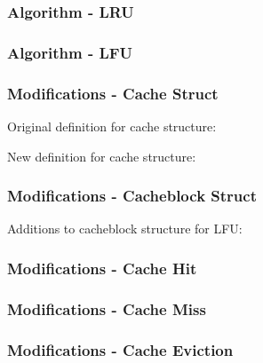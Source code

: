 \documentclass{beamer}
\begin{document}
\begin{frame}
  \frametitle{Algorithm - LRU}

  

\end{frame}

\begin{frame}
  \frametitle{Algorithm - LFU}

  

\end{frame}

\begin{frame}
  \frametitle{Modifications - Cache Struct}

  Original definition for cache structure:
  \begin{adjustbox}{width=\textwidth,keepaspectratio}
    
  \end{adjustbox}

  \vspace{\baselineskip}

  New definition for cache structure:
  \begin{adjustbox}{width=\textwidth,keepaspectratio}
    
  \end{adjustbox}

\end{frame}

\begin{frame}
  \frametitle{Modifications - Cacheblock Struct}

  Additions to cacheblock structure for LFU:
  \begin{adjustbox}{width=\textwidth,keepaspectratio}
    
  \end{adjustbox}

\end{frame}

\begin{frame}
  \frametitle{Modifications - Cache Hit}

  \begin{adjustbox}{width=\textwidth,keepaspectratio}
    
  \end{adjustbox}

\end{frame}

\begin{frame}
  \frametitle{Modifications - Cache Miss}

  \begin{adjustbox}{width=\textwidth,keepaspectratio}
    
  \end{adjustbox}

\end{frame}

\begin{frame}
  \frametitle{Modifications - Cache Eviction}

  \begin{adjustbox}{width=\textwidth,keepaspectratio}
    
  \end{adjustbox}

\end{frame}
\end{document}
